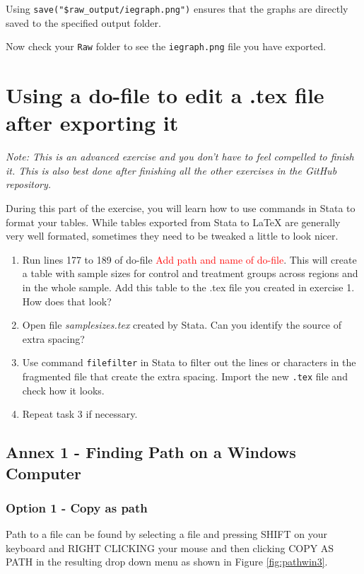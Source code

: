 \documentclass[]{article}
\begin{document}
Using \verb|save("$raw_output/iegraph.png")| ensures that the graphs are directly saved to the specified output folder. 

Now check your \texttt{Raw} folder to see the \texttt{iegraph.png} file you have exported.


\section{Using a do-file to edit a .tex file after exporting it}
\textit{Note: This is an advanced exercise and you don't have to feel compelled to finish it. This is also best done after finishing all the other exercises in the GitHub repository.}

During this part of the exercise, you will learn how to use commands in Stata to format your tables. While tables exported from Stata to {\LaTeX} are generally very well formated, sometimes they need to be tweaked a little to look nicer.

\begin{enumerate}
	\item Run lines 177 to 189 of do-file \textcolor{red}{Add path and name of do-file}. This will create a table with sample sizes for control and treatment groups across regions and in the whole sample. Add this table to the .tex file you created in exercise 1. How does that look?
	\item Open file \emph{samplesizes.tex} created by Stata. Can you identify the source of extra spacing?
	\item Use command \texttt{filefilter} in Stata to filter out the lines or characters in the fragmented file that create the extra spacing. Import the new \texttt{.tex} file and check how it looks.
	\item Repeat task 3 if necessary.
\end{enumerate}

\newpage

\subsection*{Annex 1 - Finding Path on a Windows Computer}\label{annex:windows}

\subsubsection*{Option 1 - Copy as path}
Path to a file can be found by selecting a file and pressing {\color{red}SHIFT on your keyboard and RIGHT CLICKING your mouse and then clicking COPY AS PATH in the resulting drop down menu} as shown in Figure \ref{fig:pathwin3}.
\end{document}
